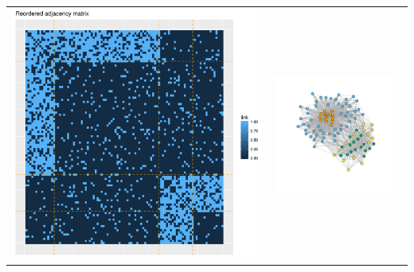 \documentclass[compress,10pt]{beamer}
\begin{document}
\begin{frame}
\centering
\begin{tabular}{ccc}
 \includegraphics[scale=.2]{plots/Etoile_reordered_adja_with_groups.png}&
\includegraphics[scale=.2]{plots/Etoile_graphe_with_colors.png}&

\end{tabular}
\end{frame}
\end{document}
